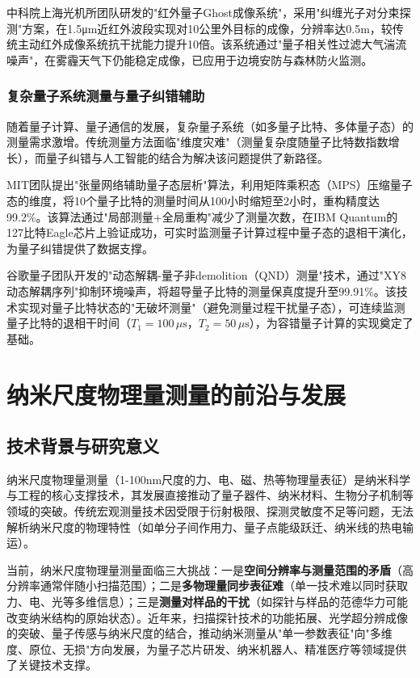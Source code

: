 \documentclass[lettersize,journal]{IEEEtran}
\begin{document}
	中科院上海光机所团队研发的"红外量子Ghost成像系统"，采用"纠缠光子对分束探测"方案，在1.5μm近红外波段实现对10公里外目标的成像，分辨率达0.5m，较传统主动红外成像系统抗干扰能力提升10倍\cite{siofm2024ghost_imaging}。该系统通过"量子相关性过滤大气湍流噪声"，在雾霾天气下仍能稳定成像，已应用于边境安防与森林防火监测。
	
	\subsubsection{复杂量子系统测量与量子纠错辅助}
	随着量子计算、量子通信的发展，复杂量子系统（如多量子比特、多体量子态）的测量需求激增。传统测量方法面临"维度灾难"（测量复杂度随量子比特数指数增长），而量子纠错与人工智能的结合为解决该问题提供了新路径。
	
	MIT团队提出"张量网络辅助量子态层析"算法，利用矩阵乘积态（MPS）压缩量子态的维度，将10个量子比特的测量时间从100小时缩短至2小时，重构精度达99.2\%\cite{mit2024tensor_tomography}。该算法通过"局部测量+全局重构"减少了测量次数，在IBM Quantum的127比特Eagle芯片上验证成功，可实时监测量子计算过程中量子态的退相干演化，为量子纠错提供了数据支撑。
	
	谷歌量子团队开发的"动态解耦-量子非demolition（QND）测量"技术，通过"XY8动态解耦序列"抑制环境噪声，将超导量子比特的测量保真度提升至99.91\%\cite{google2024qnd_measurement}。该技术实现对量子比特状态的"无破坏测量"（避免测量过程干扰量子态），可连续监测量子比特的退相干时间（$T_1=100\,\mu\text{s}$，$T_2=50\,\mu\text{s}$），为容错量子计算的实现奠定了基础。
	
	
	\section{纳米尺度物理量测量的前沿与发展}
	\label{sec:nanoscale}
	
	\subsection{技术背景与研究意义}
	纳米尺度物理量测量（1-100nm尺度的力、电、磁、热等物理量表征）是纳米科学与工程的核心支撑技术，其发展直接推动了量子器件、纳米材料、生物分子机制等领域的突破。传统宏观测量技术因受限于衍射极限、探测灵敏度不足等问题，无法解析纳米尺度的物理特性（如单分子间作用力、量子点能级跃迁、纳米线的热电输运）。
	
	当前，纳米尺度物理量测量面临三大挑战：一是\textbf{空间分辨率与测量范围的矛盾}（高分辨率通常伴随小扫描范围）；二是\textbf{多物理量同步表征难}（单一技术难以同时获取力、电、光等多维信息）；三是\textbf{测量对样品的干扰}（如探针与样品的范德华力可能改变纳米结构的原始状态）。近年来，扫描探针技术的功能拓展、光学超分辨成像的突破、量子传感与纳米尺度的结合，推动纳米测量从"单一参数表征"向"多维度、原位、无损"方向发展，为量子芯片研发、纳米机器人、精准医疗等领域提供了关键技术支撑。
	
\end{document}
